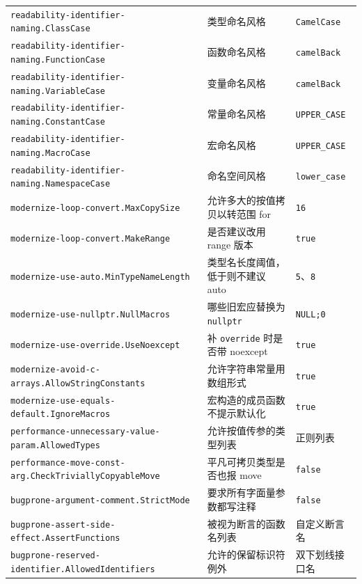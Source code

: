 \documentclass[12pt,a4paper,fontset=fandol]{ctexbook}
\begin{document}
{\begin{longtable}{@{}>{\raggedright\arraybackslash}p{}
                  >{\raggedright\arraybackslash}p{}
                  >{\raggedright\arraybackslash}p{}@{}}
\texttt{readability-\allowbreak identifier-naming.\allowbreak ClassCase} & 类型命名风格 & \texttt{CamelCase} \\
\texttt{readability-\allowbreak identifier-naming.\allowbreak FunctionCase} & 函数命名风格 & \texttt{camelBack} \\
\texttt{readability-\allowbreak identifier-naming.\allowbreak VariableCase} & 变量命名风格 & \texttt{camelBack} \\
\texttt{readability-\allowbreak identifier-naming.\allowbreak ConstantCase} & 常量命名风格 & \texttt{UPPER\_CASE} \\
\texttt{readability-\allowbreak identifier-naming.\allowbreak MacroCase} & 宏命名风格 & \texttt{UPPER\_CASE} \\
\texttt{readability-\allowbreak identifier-naming.\allowbreak NamespaceCase} & 命名空间风格 & \texttt{lower\_case} \\
\texttt{modernize-loop-convert.\allowbreak MaxCopySize} & 允许多大的按值拷贝以转范围 for & \texttt{16} \\
\texttt{modernize-loop-convert.\allowbreak MakeRange} & 是否建议改用 range 版本 & \texttt{true} \\
\texttt{modernize-use-auto.\allowbreak MinTypeNameLength} & 类型名长度阈值，低于则不建议 auto & \texttt{5}、\texttt{8} \\
\texttt{modernize-use-nullptr.\allowbreak NullMacros} & 哪些旧宏应替换为 \texttt{nullptr} & \texttt{NULL;0} \\
\texttt{modernize-use-override.\allowbreak UseNoexcept} & 补 \texttt{override} 时是否带 noexcept & \texttt{true} \\
\texttt{modernize-avoid-c-arrays.\allowbreak AllowStringConstants} & 允许字符串常量用数组形式 & \texttt{true} \\
\texttt{modernize-use-equals-default.\allowbreak IgnoreMacros} & 宏构造的成员函数不提示默认化 & \texttt{true} \\
\texttt{performance-unnecessary-\allowbreak value-param.AllowedTypes} & 允许按值传参的类型列表 & 正则列表 \\
\texttt{performance-move-const-arg.\allowbreak CheckTriviallyCopyableMove} & 平凡可拷贝类型是否也报 move & \texttt{false} \\
\texttt{bugprone-argument-comment.\allowbreak StrictMode} & 要求所有字面量参数都写注释 & \texttt{false} \\
\texttt{bugprone-assert-side-effect.\allowbreak AssertFunctions} & 被视为断言的函数名列表 & 自定义断言名 \\
\texttt{bugprone-reserved-identifier.\allowbreak AllowedIdentifiers} & 允许的保留标识符例外 & 双下划线接口名 \\

\end{longtable}}
\end{document}
